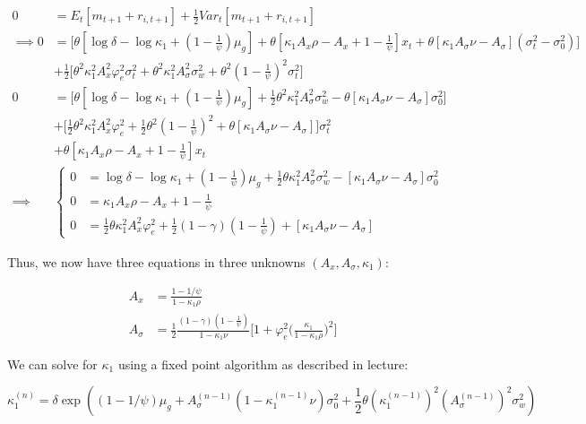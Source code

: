 \documentclass{article}
\begin{document}
\begin{enumerate}
\begin{align*}
0&= E_t[m_{t+1} + r_{i,t+1}] + \frac{1}{2} Var_t[m_{t+1} + r_{i,t+1}]\\
\implies
0&= \Bigg[ \theta[\log \delta - \log \kappa_1 + (1- \frac{1}{\psi})\mu_g ] + \theta[\kappa_1 A_x \rho - A_x + 1 - \frac{1}{\psi}] x_t + \theta[\kappa_1 A_\sigma \nu - A_\sigma](\sigma_t^2 - \sigma_0^2) \Bigg] \\
&+ \frac{1}{2} \Bigg[ \theta^2\kappa_1^2 A_x^2 \varphi_e^2 \sigma_t^2  + \theta^2\kappa_1^2 A_\sigma^2 \sigma_w^2 + \theta^2 (1-\frac{1}{\psi})^2 \sigma_t^2\Bigg]\\
0&= \Bigg[ \theta[\log \delta - \log \kappa_1 + (1- \frac{1}{\psi})\mu_g ]+ \frac{1}{2}\theta^2\kappa_1^2 A_\sigma^2 \sigma_w^2  - \theta[\kappa_1 A_\sigma \nu - A_\sigma]\sigma_0^2 \Bigg] \\
&+ \Bigg[ \frac{1}{2} \theta^2\kappa_1^2 A_x^2 \varphi_e^2   + \frac{1}{2} \theta^2 (1-\frac{1}{\psi})^2 + \theta[\kappa_1 A_\sigma \nu - A_\sigma]\Bigg]\sigma_t^2 \\&+ 
\theta[\kappa_1 A_x \rho - A_x + 1 - \frac{1}{\psi}] x_t\\
\implies&
\begin{cases}
0 &= \log \delta - \log \kappa_1 + (1- \frac{1}{\psi})\mu_g + \frac{1}{2}\theta\kappa_1^2 A_\sigma^2 \sigma_w^2  - [\kappa_1 A_\sigma \nu - A_\sigma]\sigma_0^2\\
0 &= \kappa_1 A_x \rho - A_x + 1 - \frac{1}{\psi} \\
0 &= \frac{1}{2} \theta\kappa_1^2 A_x^2 \varphi_e^2   + \frac{1}{2} (1-\gamma) (1-\frac{1}{\psi})  + [\kappa_1 A_\sigma \nu - A_\sigma]
\end{cases}
\end{align*}

\pagebreak

Thus, we now have three equations in three unknowns $(A_x, A_\sigma, \kappa_1)$:

\begin{align*}
A_x &= \frac{1 - 1/\psi}{1 - \kappa_1 \rho}\\
A_\sigma &= \frac{1}{2}\frac{(1-\gamma)(1-\frac{1}{\psi})}{1-\kappa_1 \nu}\Bigg[1 + \varphi_e^2\Big(\frac{\kappa_1}{1-\kappa_1 \rho}\Big)^2\Bigg]
\end{align*}

We can solve for $\kappa_1$ using a fixed point algorithm as described in lecture:

$$
\kappa_1^{(n)} = \delta \exp((1-1/\psi)\mu_g + A_\sigma^{(n-1)}(1 - \kappa_1^{(n-1)} \nu)\sigma_0^2 + \frac{1}{2} \theta(\kappa_1^{(n-1)})^2 (A_\sigma^{(n-1)})^2\sigma_w^2)
$$


\end{enumerate}
\end{document}
